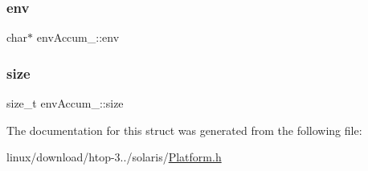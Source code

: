 \mbox{\label{structenvAccum___a552198a002cfdec4c9fcadebf6a4362b}} 
\subsubsection{\texorpdfstring{env}{env}}
{\footnotesize\ttfamily char$\ast$ env\+Accum\+\_\+\+::env}

\mbox{\label{structenvAccum___a65cfbf73ff66184c6d889151e7ba7579}} 
\subsubsection{\texorpdfstring{size}{size}}
{\footnotesize\ttfamily size\+\_\+t env\+Accum\+\_\+\+::size}



The documentation for this struct was generated from the following file\+:\begin{DoxyCompactItemize}
\item 
linux/download/htop-\/3../solaris/\hyperlink{solaris_2Platform_8h}{Platform.\+h}\end{DoxyCompactItemize}
